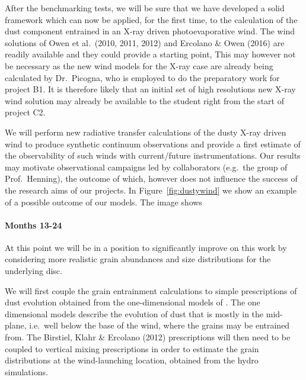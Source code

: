 \documentclass[10pt,fleqn,twoside]{article}
\begin{document}
After the benchmarking tests, we will be sure that we have developed a
solid framework which can now be applied, for the
first time, to the calculation of the dust component entrained in an
X-ray driven photoevaporative wind. The wind solutions of Owen et
al.\ (2010, 2011, 2012) and Ercolano \& Owen (2016) are readily
available and they could provide a starting point,  This may however
not be necessary as the new wind models for the X-ray case
are already being calculated by Dr.\ Picogna, who is employed to do the
preparatory work for project B1. It is therefore likely that an
initial set of high resolutions new X-ray wind solution may already be
available to the student right from the start of project C2.
 

We will perform new radiative transfer calculations of the dusty
X-ray driven wind to produce synthetic continuum observations and
provide a first estimate of the observability of such winds with
current/future instrumentations. Our results may motivate
observational campaigns led by collaborators (e.g.\ the group of
Prof.\ Henning), the outcome of which, however does not influence the
success of the research aims of our projects. In
Figure~\ref{fig:dustywind} we show an example of a possible outcome of
our models. The image shows 


\paragraph{Months 13-24}
 
At this point we will be in a position to significantly improve on
this work by considering more realistic grain abundances and size
distributions for the underlying disc. 

We will first couple the grain entrainment calculations to simple
prescriptions of dust  evolution \citep[e.g.,][]{2012A&A...539A.148B}
obtained from the one-dimensional models of
\citet{2010A&A...513A..79B}. The one dimensional models describe the
evolution of dust that is mostly in the mid-plane, i.e.\ well below the
base of the wind, where the grains may be entrained from. The
Birstiel, Klahr \& Ercolano (2012) prescriptions will then need to be
coupled to vertical mixing prescriptions \citep{2009A&A...496..597F} in order to
estimate the grain distributions at the wind-launching location,
obtained from the hydro simulations. 
\end{document}
